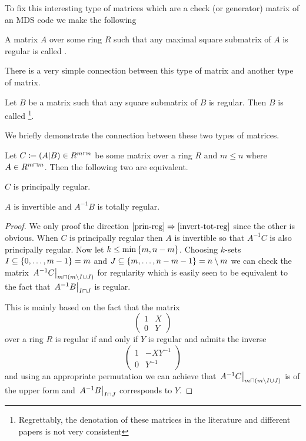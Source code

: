 To fix this interesting type of matrices which are a check (or generator) matrix of an MDS code we make the following

\begin{definition}
    A matrix $A$ over some ring $R$ such that any maximal square submatrix of $A$ is regular is called .
\end{definition}

There is a very simple connection between this type of matrix and another type of matrix.

\begin{definition}
    Let $B$ be a matrix such that any square submatrix of $B$ is regular. Then $B$ is called \footnote{Regrettably, the denotation of these matrices in the literature and different papers is not very consistent}. 
\end{definition}

We briefly demonstrate the connection between these two types of matrices.

\begin{lemma}
    Let $C\defeq(A|B)\in R^{m\setprod n}$ be some matrix over a ring $R$ and $m\leq n$ where $A\in R^{m\setprod m}$.
    Then the following two are equivalent.
    \begin{statements}
            \item\label{prin-reg} $C$ is principally regular.
            \item\label{invert-tot-reg} $A$ is invertible and $A^{-1}B$ is totally regular.
    \end{statements}
\end{lemma}

\begin{proof}
    We only proof the direction $\autoref{prin-reg}\implies\autoref{invert-tot-reg}$ since the other is obvious.
    When $C$ is principally regular then $A$ is invertible so that $A^{-1}C$ is also principally regular. Now let $k\leq \min\set{m,n-m}$. Choosing $k$-sets $I\setleq\set{\range 0 {m-1}}=m$ and $J\setleq \set{\range m {n-m-1}}=n\setminus m$ we can check the matrix $\rest{A^{-1}C}_{m\setprod (m\setminus I\setjoin J)}$ for regularity which is easily seen to be equivalent to the fact that $\rest{A^{-1}B}_{I\setprod J}$ is regular.

    This is mainly based on the fact that the matrix
    $$
    \begin{pmatrix}
        1 & X \\
        0 & Y
    \end{pmatrix}
    $$
    over a ring $R$ is regular if and only if $Y$ is regular and admits the inverse
    $$
    \begin{pmatrix}
        1 & -XY^{-1}\\
        0 & Y^{-1}
    \end{pmatrix}
    $$
    and using an appropriate permutation we can achieve that $\rest{A^{-1}C}_{m\setprod (m\setminus I\setjoin J)}$ is of the upper form and $\rest{A^{-1}B}_{I\setprod J}$ corresponds to $Y$.
\end{proof}

